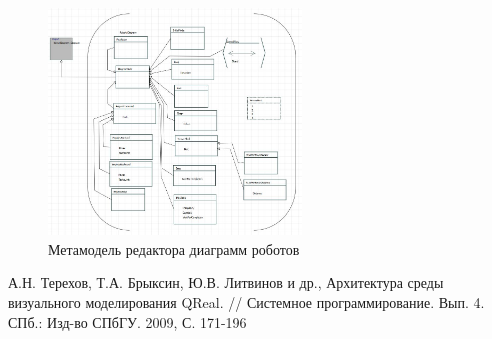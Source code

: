 \documentclass[a4paper]{article}
\begin{document}
\begin{figure} [ht]
  \begin{center}
    \includegraphics[width=0.6\textwidth]{robotsMetamodel.jpg}
    \caption{Метамодель редактора диаграмм роботов}
    \label{robotsMetamodel}
  \end{center}
\end{figure}

\begin{thebibliography}{9001}
   А.Н. Терехов, Т.А. Брыксин, Ю.В. Литвинов и др., Архитектура среды визуального моделирования QReal. // Системное программирование. Вып. 4. СПб.: Изд-во СПбГУ. 2009, С. 171-196
\end{thebibliography}
\end{document}
